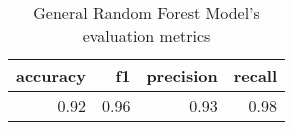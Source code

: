 \begin{table}
\centering
\caption{General Random Forest Model's evaluation metrics}
\begin{tabular}{rrrr}
\toprule
 accuracy &   f1 &  precision &  recall \\
\midrule
     0.92 & 0.96 &       0.93 &    0.98 \\
\bottomrule
\end{tabular}
\end{table}
